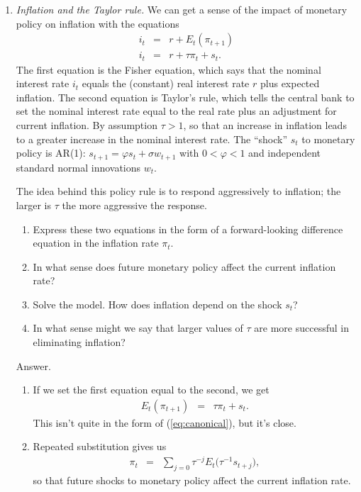 \documentclass[11pt]{article}
\begin{document}
\begin{enumerate}
\item  {\it Inflation and the Taylor rule.\/}
We can get a sense of the impact of monetary policy on
inflation with the equations
\begin{eqnarray*}
    i_t &=& r + E_t (\pi_{t+1}) \\
    i_t &=& r + \tau \pi_t + s_t.
\end{eqnarray*}
The first equation is the Fisher equation, which says that the nominal interest rate $i_t$
equals the (constant) real interest rate $r$ plus expected inflation.
The second equation is Taylor's rule, which tells the central bank to set the
nominal interest rate equal to the real rate plus an adjustment for current inflation.
By assumption $\tau > 1$, so that an increase in inflation leads to a greater increase
in the nominal interest rate.
The ``shock'' $s_t$ to monetary policy is AR(1):
$s_{t+1} = \varphi s_t + \sigma w_{t+1}$ with $0 < \varphi < 1$
and independent standard normal innovations $w_t$.

The idea behind this policy rule is to respond aggressively to inflation;
the larger is $\tau$ the more aggressive the response.
%
\begin{enumerate}
\item Express these two equations in the form of a forward-looking difference equation
in the inflation rate $\pi_t$.

\item In what sense does future monetary policy affect the current inflation rate?

\item Solve the model.  How does inflation depend on the shock $s_t$?

\item In what sense might we say that larger values of $\tau$ are more successful
in eliminating inflation?
\end{enumerate}

Answer.
\begin{enumerate}
\item If we set the first equation
equal to the second, we get
\begin{eqnarray*}
    E_t (\pi_{t+1}) &=& \tau \pi_t + s_t .
\end{eqnarray*}
This isn't quite in the form of (\ref{eq:canonical}), but it's close.

\item Repeated substitution gives us
\begin{eqnarray*}
    \pi_{t} &=&  \sum_{j=0} \tau^{-j} E_t \big( \tau^{-1} s_{t+j} \big) ,
\end{eqnarray*}
so that future shocks to monetary policy affect the current inflation rate.



\end{enumerate}
\end{enumerate}
\end{document}
